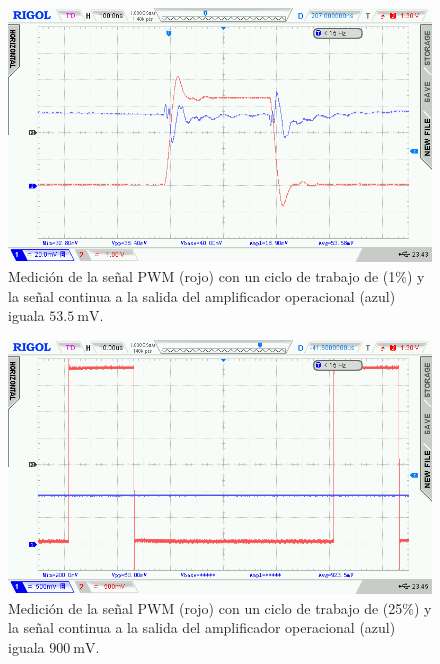 \begin{figure}[H]
    \centering
    \includegraphics[width=0.9\linewidth]{Figuras/datalogger/Hardware/MedicionesPWM/1.png}
    \caption{Medición de la señal PWM (rojo) con un ciclo de trabajo de (1\%) y la señal continua a la salida del amplificador operacional (azul) iguala $\SI{53.5}{\milli\volt}$.}
    \label{fig:1}
\end{figure}

\begin{figure}[H]
    \centering
    \includegraphics[width=0.9\linewidth]{Figuras/datalogger/Hardware/MedicionesPWM/63.png}
    \caption{Medición de la señal PWM (rojo) con un ciclo de trabajo de (25\%) y la señal continua a la salida del amplificador operacional (azul) iguala $\SI{900}{\milli\volt}$.}
    \label{fig:63}
\end{figure}


